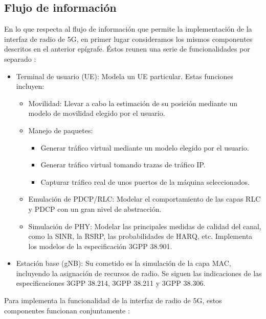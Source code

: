 \documentclass[12pt]{report} %
\begin{document}
\subsection{Flujo de información}

En lo que respecta al  flujo de información que permite la implementación de la interfaz de radio de 5G, en primer lugar consideramos los mismos componentes descritos en el anterior epígrafe.
Éstos reunen una serie de funcionalidades por separado \cite{RefWorks:5, RefWorks:3, RefWorks:7}:

\begin{itemize}
\item {
	Terminal de usuario (UE):
	Modela un UE particular. Estas funciones incluyen:
	\begin{itemize}
	\item Movilidad:
	Llevar a cabo la estimación de su posición mediante un modelo de movilidad elegido por el usuario.
	\item {
		Manejo de paquetes:
		\begin{itemize}
		\item Generar tráfico virtual mediante un modelo elegido por el usuario.
		\item Generar tráfico virtual tomando trazas de tráfico IP.
		\item Capturar tráfico real de unos puertos de la máquina seleccionados.
		\end{itemize}
	}
	\item Emulación de PDCP/RLC:
	Modelar el comportamiento de las capas RLC y PDCP con un gran nivel de abstracción.
	\item Simulación de PHY:
	Modelar las principales medidas de calidad del canal, como la SINR, la RSRP, las probabilidades de HARQ, etc.
	Implementa los modelos de la especificación 3GPP 38.901.
	\end{itemize}
}
\item Estación base (gNB):
Su cometido es la simulación de la capa MAC, incluyendo la asignación de recursos de radio.
Se siguen las indicaciones de las especificaciones 3GPP 38.214, 3GPP 38.211 y 3GPP 38.306.
\end{itemize}

Para implementa la funcionalidad de la interfaz de radio de 5G, estos componentes funcionan conjuntamente \cite{RefWorks:5, RefWorks:3}:
\end{document}
